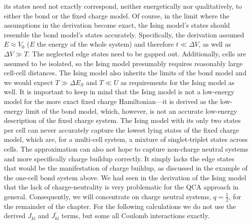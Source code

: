its states need not exactly correspond, neither energetically nor qualitatively, to either the bond or the fixed charge
model. Of course, in the limit where the assumptions in the derivation become
exact, the Ising model's states should resemble the bond model's states
accurately. Specifically, the derivation assumed $E \approx V_0$ ($E$ the energy
of the whole system) and therefore $t \ll \Delta V$, as well as $\Delta V \gg
T$. The neglected edge states need to be gapped out. Additionally, cells are
assumed to be isolated, so the Ising model presumably requires reasonably large
cell-cell distances. The Ising model also inherits the limits of the bond model and we
would expect $T \gg \Delta E_S$ and $T \ll U$ as requirements for the Ising
model as well. It is important to keep in mind that the Ising model is not a low-energy
model for the more exact fixed charge Hamiltonian---it is derived as the
low-energy limit of the bond model, which, however, is not an accurate
low-energy description of the fixed charge system. The Ising model with its only
two states per cell can never accurately capture the lowest lying states of the
fixed charge model, which are, for a multi-cell system, a mixture of
singlet-triplet states across cells. The approximation can also not hope to
capture non-charge neutral systems and more specifically charge buildup
correctly. It simply lacks the edge states that would be the manifestation of
charge buildup, as discussed in the example of the one-cell bond system above.
We had seen in the derivation of the Ising model that the lack of
charge-neutrality is very problematic for the QCA approach in general.
Consequently, we will concentrate on charge neutral systems, $q = \frac{1}{2}$,
for the remainder of the chapter. For the following calculations we do not use
the derived $J_{kl}$ and $J^{\prime}_{kl}$ terms, but some all Coulomb
interactions exactly.

